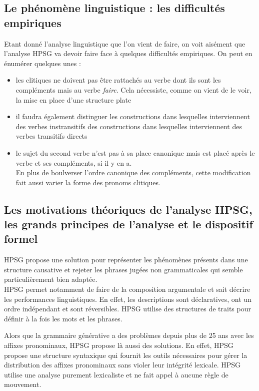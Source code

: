 \newpage

\subsection{Le phénomène linguistique : les difficultés empiriques}

Etant donné l'analyse linguistique que l'on vient de faire, on voit aisément que l'analyse HPSG va devoir faire face à quelques difficultés empiriques.
On peut en énumérer quelques unes :\\

\begin{itemize}
  \item les clitiques ne doivent pas être rattachés au verbe dont ils sont les compléments mais au verbe \emph{faire}.
    Cela nécessiste, comme on vient de le voir, la mise en place d'une structure plate
  \item il faudra également distinguer les constructions dans lesquelles interviennent des verbes instransitifs des constructions dans lesquelles interviennent des verbes transitifs directs
  \item le sujet du second verbe n'est pas à sa place canonique mais est placé après le verbe et ses compléments, si il y en a.\\
    En plus de boulverser l'ordre canonique des compléments, cette modification fait aussi varier la forme des pronoms clitiques.
\end{itemize}

\newpage

\subsection{Les motivations théoriques de l'analyse HPSG, les grands principes de l'analyse et le dispositif formel}

HPSG propose une solution pour représenter les phénomènes présents dans une structure causative et rejeter les phrases jugées non grammaticales qui semble particulièrement bien adaptée.\\

HPSG permet notamment de faire de la composition argumentale et sait décrire les performances linguistiques.
En effet, les descriptions sont déclaratives, ont un ordre indépendant et sont réversibles.
HPSG utilise des structures de traits pour définir à la fois les mots et les phrases.

Alors que la grammaire générative a des problèmes depuis plus de 25 ans avec les affixes pronominaux, HPSG propose là aussi des solutions.
En effet, HPSG propose une structure syntaxique qui fournit les outils nécessaires pour gérer la distribution des affixes pronominaux sans violer leur intégrité lexicale.
HPSG utilise une analyse purement lexicaliste et ne fait appel à aucune règle de mouvement.\\

